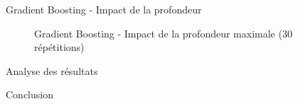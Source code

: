 \documentclass{beamer}
\begin{document}
\begin{frame}{Gradient Boosting - Impact de la profondeur}
	\begin{figure}
		\begin{center}
			\caption{Gradient Boosting - Impact de la profondeur maximale (30 répétitions)}
			\label{gb_estimators}
		\end{center}
	\end{figure}
\end{frame}

\begin{frame}{Analyse des résultats}
\end{frame}

\begin{frame}{Conclusion}
\end{frame}
\end{document}
